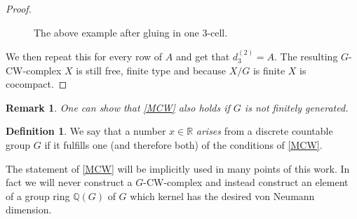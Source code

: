 \documentclass[12pt,a4paper]{scrartcl}
\theoremstyle{plain}
\newtheorem{Remark}[Theorem]{Remark}
\theoremstyle{definition}
\newtheorem{Definition}[Theorem]{Definition}
\newcommand{\R}{\mathbb{R}} %
\newcommand{\Q}{\mathbb{Q}} %
\newcommand{\2}{\mathbb{Z} / 2 \mathbb{Z}}
\newcommand{\1}{\bar{1}}
\newcommand{\0}{\bar{0}}
\begin{document}
\begin{proof}
\begin{figure}[H]
			\caption{The above example after gluing in one $3$-cell.}
			\label{GCW_Grafik2}
		\end{figure}
		
		
	We then repeat this for every row of $A$ and get that $d_3^{(2)} = A$. The resulting $G$-CW-complex $X$ is still free, finite type and because $X/G$ is finite $X$ is cocompact.
\end{proof}

\begin{Remark}
	One can show that \ref{MCW} also holds if $G$ is not finitely generated.
\end{Remark}
\begin{Definition}\label{def_arising}
	We say that a number $x \in \R$ \emph{arises} from a discrete countable group $G$ if it fulfills one (and therefore both) of the conditions of \ref{MCW}.
\end{Definition}
The statement of \ref{MCW} will be implicitly used in many points of this work. In fact we will never construct a $G$-CW-complex and instead construct an element of a group ring $\Q (G)$ of $G$ which kernel has the desired von Neumann dimension.
\end{document}
